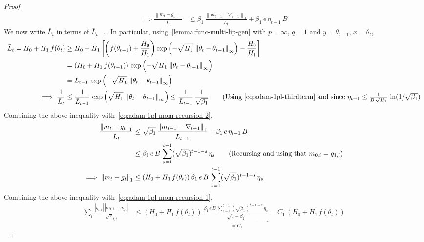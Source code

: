 \documentclass{article}
\newcommand{\ti}[1]{#1_{t,i}}
\newcommand{\norm}[1]{\left\|#1 \right\|}
\newcommand{\tht}{\theta_t}
\begin{document}
\begin{proof}
\begin{align}
\implies \frac{\norm{m_t - g_t}_1}{\bar{L}_t} & \leq \beta_1 \, \frac{\norm{m_{t-1}  - \nabla_{t-1}}_{1}}{\bar{L}_t} + \beta_1 \,e \, \eta_{t-1} \, B \label{eq:adam-1pl-mom-recursion-2}
\end{align}
We now write $\bar{L}_t$ in terms of $\bar{L}_{t-1}$. In particular, using~\cref{lemma:func-multi-lip-gen} with $p = \infty$, $q = 1$ and $y = \theta_{t-1}$, $x = \tht$, 
\begin{align}
\bar{L}_t = H_0 + H_1 \, f(\tht) & \geq H_0 + H_1 \left[ \left(f(\theta_{t-1}) + \frac{H_0}{H_1} \right) \exp\left(-\sqrt{H_1} \, \norm{\tht - \theta_{t-1}}_{\infty} \right) - \frac{H_0}{H_1} \right] \nonumber\\
& = \left(H_0 + H_1 \, f(\theta_{t-1}) \right) \, \exp\left(-\sqrt{H_1} \, \norm{\tht - \theta_{t-1}}_{\infty} \right) \nonumber \\
&= \bar{L}_{t-1} \, \exp\left(-\sqrt{H_1} \, \norm{\tht - \theta_{t-1}}_{\infty} \right) \nonumber\\
\implies \frac{1}{\bar{L}_t} & \leq \frac{1}{\bar{L}_{t-1}} \, \exp\left(\sqrt{H_1} \, \norm{\tht - \theta_{t-1}}_{\infty} \right) \leq \frac{1}{\bar{L}_{t-1}} \, \frac{1}{\sqrt{\beta_1}} \tag{Using~\cref{eq:adam-1pl-thirdterm} and since $\eta_{t-1} \leq \frac{1}{B \, \sqrt{H_1}} \, \ln(1/\sqrt{\beta_1}$}
\end{align}
Combining the above inequality with~\cref{eq:adam-1pl-mom-recursion-2}, 
\begin{align}
\frac{\norm{m_t - g_t}_1}{\bar{L}_t} & \leq \sqrt{\beta_1} \, \frac{\norm{m_{t-1}  - \nabla_{t-1}}_{1}}{\bar{L}_{t-1}} + \beta_1\,e \, \eta_{t-1} \, B \\
& \leq \beta_1\,e \, B \, \sum_{s = 1}^{t-1} (\sqrt{\beta_1})^{t-1-s} \, \eta_{s} \tag{Recursing and using that $m_{0,i} = g_{1,i}$} \\
\implies \norm{m_t - g_t}_1 & \leq (H_0 + H_1 \, f(\tht)) \, \beta_1\,e \, B \, \sum_{s = 1}^{t-1} (\sqrt{\beta_1})^{t-1-s} \, \eta_{s} \label{eq:adam-1pl-mom-recursion-final}
\end{align}
Combining the above inequality with~\cref{eq:adam-1pl-mom-recursion-1}, 
\begin{align*}
\sum_i \frac{|\ti{g}| \, |\ti{m} - \ti{g}|}{\ti{\sqrt{v}}}  & \leq (H_0 + H_1 \, f(\tht)) \, \underbrace{\frac{\beta_1\,e \, B \, \sum_{s = 1}^{t-1} (\sqrt{\beta_1})^{t-1-s} \, \eta_{s}}{\sqrt{1 - \beta_2}}}_{:= C_1} = C_1 \, (H_0 + H_1 \, f(\tht)) 
\end{align*}
    
\end{proof}
\end{document}
